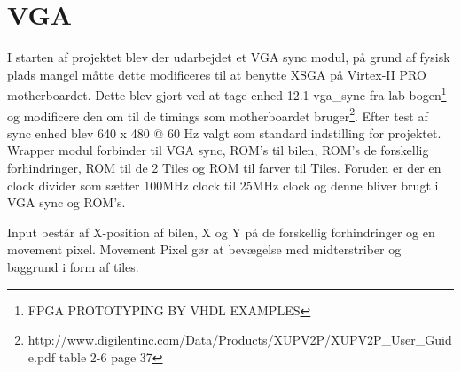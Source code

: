 \section{VGA}
I starten af projektet blev der udarbejdet et VGA sync modul, på grund af fysisk plads mangel måtte dette modificeres til at benytte XSGA på Virtex-II PRO motherboardet. Dette blev gjort ved at tage enhed 12.1 vga\_sync fra lab bogen\footnote{FPGA PROTOTYPING BY VHDL EXAMPLES} og modificere den om til de timings som motherboardet bruger\footnote{http://www.digilentinc.com/Data/Products/XUPV2P/XUPV2P\_User\_Guide.pdf table 2-6 page 37}.
Efter test af sync enhed blev 640 x 480 @ 60 Hz valgt som standard indstilling for projektet.
Wrapper modul forbinder til VGA sync, ROM's til bilen, ROM's de forskellig forhindringer, ROM til de 2 Tiles og ROM til farver til Tiles. Foruden er der en clock divider som sætter 100MHz clock til 25MHz clock og denne bliver brugt i VGA sync og ROM's. 

Input består af X-position af bilen, X og Y på de forskellig forhindringer og en movement pixel. Movement Pixel gør at bevægelse med midterstriber og baggrund i form af tiles.

